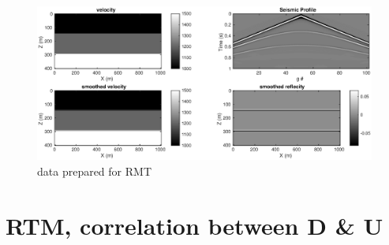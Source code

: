 \documentclass[a4paper]{article}
\begin{document}
	\begin{figure}[ht]
		\centering
		\includegraphics[width=1\linewidth]{./fig/rtm_simuationData.eps}
		\caption{data prepared for RMT}
		\label{rtm_simD}
	\end{figure}

	\section{RTM, correlation between D \& U}











\end{document}
